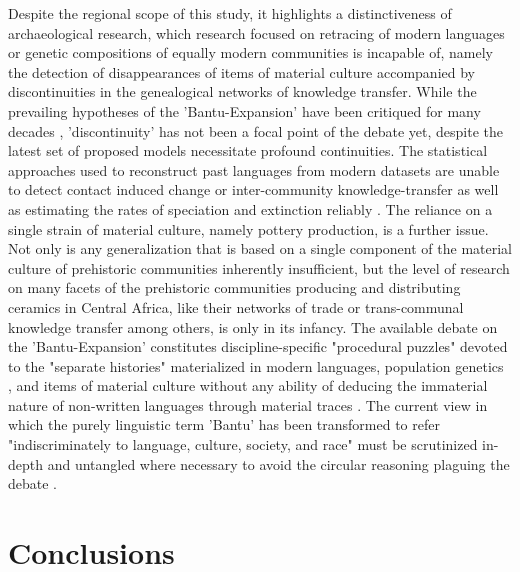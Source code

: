 \documentclass[smallextended,natbib]{svjour3}       %
\begin{document}
Despite the regional scope of this study, it highlights a distinctiveness of archaeological research, which research focused on retracing of modern languages or genetic compositions of equally modern communities is incapable of, namely the detection of disappearances of items of material culture accompanied by discontinuities in the genealogical networks of knowledge transfer. While the prevailing hypotheses of the 'Bantu-Expansion' have been critiqued for many decades \citep{deMaret.1989,Robertson.2000,Eggert.2005,Eggert.2016a}, 'discontinuity' has not been a focal point of the debate yet, despite the latest set of proposed models \citep{Bostoen.2015,Grollemund.2015,Grollemund.2023,Koile.2022} necessitate profound continuities. The statistical approaches used to reconstruct past languages from modern datasets are unable to detect contact induced change \cite[86]{Eggert.2016a} or inter-community knowledge-transfer as well as estimating the rates of speciation and extinction reliably \citep{Pagel.2020}. The reliance on a single strain of material culture, namely pottery production, is a further issue. Not only is any generalization that is based on a single component of the material culture of prehistoric communities inherently insufficient, but the level of research on many facets of the prehistoric communities producing and distributing ceramics in Central Africa, like their networks of trade or trans-communal knowledge transfer among others, is only in its infancy. The available debate on the 'Bantu-Expansion' constitutes discipline-specific "procedural puzzles" \citep[88]{Eggert.2016a} devoted to the "separate histories" materialized in modern languages, population genetics \citep{FortesLima.2024}, and items of material culture without any ability of deducing the immaterial nature of non-written languages through material traces \citep[85]{Eggert.2016a}. The current view in which the purely linguistic term 'Bantu' has been transformed to refer "indiscriminately to language, culture, society, and race" \citep[302]{Eggert.2005} must be scrutinized in-depth and untangled where necessary to avoid the circular reasoning plaguing the debate \citep{Ehret.1973,Phillipson.1976,Phillipson.1976b,Phillipson.1977a,Heine.1977,Bostoen.2015,Grollemund.2015,Grollemund.2023,Koile.2022}.

\section{Conclusions}
\end{document}
